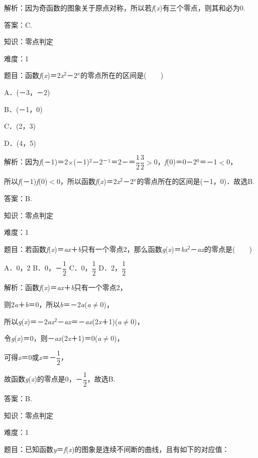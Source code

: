 \documentclass{article} %
\begin{document}
解析：因为奇函数的图象关于原点对称，所以若\textit{f}(\textit{x})有三个零点，则其和必为0.

答案：C.

知识：零点判定

难度：1

题目：函数\textit{f}(\textit{x})＝2\textit{x}${}^{2}$－2\textit{${}^{x}$}的零点所在的区间是(　　)

A．(－3，－2)   

B．(－1，0)

C．(2，3)   

D．(4，5)

解析：因为\textit{f}(－1)＝2$\mathrm{\times}$(－1)${}^{2}$－2${}^{\textrm{－}}$${}^{1}$＝2－＝$\dfrac{1}{2}$$\dfrac{3}{2}$$\mathrm{>}$0，\textit{f}(0)＝0－2${}^{0}$＝－1$\mathrm{<}$0，

所以\textit{f}(－1)\textit{f}(0)$\mathrm{<}$0，所以函数\textit{f}(\textit{x})＝2\textit{x}${}^{2}$－2\textit{${}^{x}$}的零点所在的区间是(－1，0)．故选B.

答案：B.

知识：零点判定

难度：1

题目：若函数\textit{f}(\textit{x})＝\textit{ax}＋\textit{b}只有一个零点2，那么函数\textit{g}(\textit{x})＝\textit{bx}${}^{2}$－\textit{ax}的零点是(　　)

A．0，2  B．0，－$\dfrac{1}{2}$  C．0，$\dfrac{1}{2}$  D．2，$\dfrac{1}{2}$

解析：函数\textit{f}(\textit{x})＝\textit{ax}＋\textit{b}只有一个零点2，

则2\textit{a}＋\textit{b}＝0，所以\textit{b}＝－2\textit{a}(\textit{a}$\mathrm{\neq}$0)，

所以\textit{g}(\textit{x})＝－2\textit{ax}${}^{2}$－\textit{ax}＝－\textit{ax}(2\textit{x}＋1)(\textit{a}$\mathrm{\neq}$0)，

令\textit{g}(\textit{x})＝0，则－\textit{ax}(2\textit{x}＋1)＝0(\textit{a}$\mathrm{\neq}$0)，

可得\textit{x}＝0或\textit{x}＝－$\dfrac{1}{2}$，

故函数\textit{g}(\textit{x})的零点是0，－$\dfrac{1}{2}$，故选B.

答案：B.

知识：零点判定

难度：1

题目：已知函数\textit{y}＝\textit{f}(\textit{x})的图象是连续不间断的曲线，且有如下的对应值：

\textit{}
\end{document}
